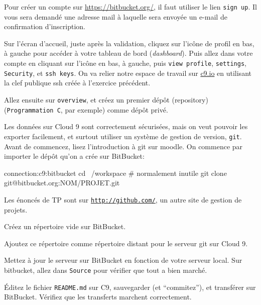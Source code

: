 
Pour créer un compte sur \url{https://bitbucket.org/}, il faut
utiliser le lien \texttt{sign up}. Il vous sera demandé une adresse
mail à laquelle sera envoyée un e-mail de confirmation d'inscription.


\question Sur l'écran d'accueil, juste après la validation, cliquez
sur l'icône de profil en bas, à gauche pour accéder à votre tableau de
bord (\emph{dashboard}). Puis allez dans votre compte en cliquant sur
l'icône en bas, à gauche, puis \texttt{view profile},
\texttt{settings}, \texttt{Security}, et \texttt{ssh keys}. On va
relier notre espace de travail sur \url{c9.io} en utilisant la clef
publique ssh créée à l'exercice précédent.

\question Allez ensuite sur \texttt{overview}, et créez un premier
dépôt (repository) (\texttt{Programmation C}, par exemple) comme dépôt
privé. 


Les données sur Cloud 9 sont correctement sécurisées, mais on veut
pouvoir les exporter facilement, et surtout utiliser un système de
gestion de version, \texttt{git}. Avant de commencez, lisez
l'introduction à git sur moodle. On commence par importer le dépôt
qu'on a crée sur BitBucket:

\begin{solution}
  \begin{bash}{connection:c9:bitbucket}
    cd ~/workspace # normalement inutile
    git clone git@bitbucket.org:NOM/PROJET.git
  \end{bash}
\end{solution}





Les énoncés de TP sont sur \texttt{\url{http://github.com/}}, un autre site
de gestion de projets.


\question Créez un répertoire vide sur BitBucket.

\question Ajoutez ce répertoire comme répertoire distant pour le
serveur git sur Cloud 9.

\question Mettez à jour le serveur sur BitBucket en fonction de votre
serveur local.  Sur bitbucket, allez dans \texttt{Source} pour
vérifier que tout a bien marché.

\question Éditez le fichier \texttt{README.md} sur C9, sauvegarder (et
``commitez''), et transférer sur BitBucket. Vérifiez que les
transferts marchent correctement.


